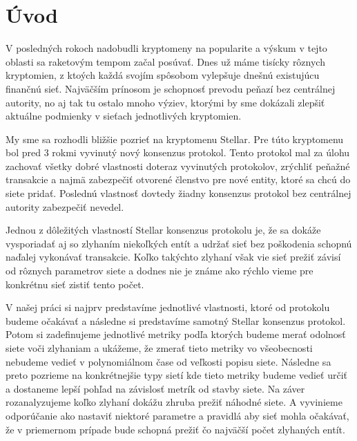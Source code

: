 \chapter*{Úvod} %

V posledných rokoch nadobudli kryptomeny na popularite a výskum v tejto
oblasti sa raketovým tempom začal posúvať. Dnes už máme tisícky rôznych
kryptomien, z ktoých každá svojím spôsobom vylepšuje dnešnú existujúcu
finančnú sieť. Najväčším prínosom je schopnosť prevodu peňazí bez
centrálnej autority, no aj tak tu ostalo mnoho výziev, ktorými by sme
dokázali zlepšiť aktuálne podmienky v sieťach jednotlivých kryptomien.

My sme sa rozhodli bližšie pozrieť na kryptomenu Stellar. Pre túto
kryptomenu bol pred 3 rokmi vyvinutý nový konsenzus protokol. Tento
protokol mal za úlohu zachovať všetky dobré vlastnosti doteraz vyvinutých
protokolov, zrýchliť peňažné transakcie a najmä zabezpečiť otvorené
členstvo pre nové entity, ktoré sa chcú do siete pridať. Poslednú vlastnosť
dovtedy žiadny konsenzus protokol bez centrálnej autority zabezpečiť nevedel.

Jednou z dôležitých vlastností Stellar konsenzus protokolu je, že sa dokáže
vysporiadať aj so zlyhaním niekoľkých entít a udržať sieť bez poškodenia
schopnú naďalej vykonávať transakcie.
Koľko takýchto zlyhaní však vie sieť prežiť závisí od rôznych parametrov siete
a dodnes nie je známe ako rýchlo vieme pre konkrétnu sieť zistiť tento počet.

V našej práci si najprv predstavíme jednotlivé vlastnosti, ktoré od protokolu
budeme očakávať a následne si predstavíme samotný Stellar konsenzus protokol.
Potom si zadefinujeme jednotlivé metriky podľa ktorých budeme merať odolnosť
siete voči zlyhaniam a ukážeme, že zmerať tieto metriky vo všeobecnosti
nebudeme vedieť v polynomiálnom čase od veľkosti popisu siete.
Následne sa preto pozrieme na konkrétnejšie typy sietí kde tieto metriky
budeme vedieť určiť a dostaneme lepší pohľad na závislosť metrík od stavby siete.
Na záver rozanalyzujeme koľko zlyhaní dokážu zhruba prežiť náhodné siete.
A vyvinieme odporúčanie ako nastaviť niektoré parametre a pravidlá aby
sieť mohla očakávať, že v priemernom prípade bude schopná prežiť čo najväčší
počet zlyhaných entít.
